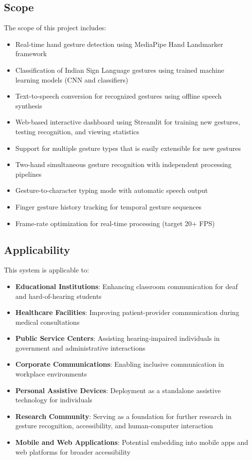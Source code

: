 \documentclass[12pt,a4paper]{report}
\begin{document}
\subsection{Scope}

The scope of this project includes:
\begin{itemize}
    \item Real-time hand gesture detection using MediaPipe Hand Landmarker framework
    \item Classification of Indian Sign Language gestures using trained machine learning models (CNN and classifiers)
    \item Text-to-speech conversion for recognized gestures using offline speech synthesis
    \item Web-based interactive dashboard using Streamlit for training new gestures, testing recognition, and viewing statistics
    \item Support for multiple gesture types that is easily extensible for new gestures
    \item Two-hand simultaneous gesture recognition with independent processing pipelines
    \item Gesture-to-character typing mode with automatic speech output
    \item Finger gesture history tracking for temporal gesture sequences
    \item Frame-rate optimization for real-time processing (target 20+ FPS)
\end{itemize}

\subsection{Applicability}

This system is applicable to:
\begin{itemize}
    \item \textbf{Educational Institutions}: Enhancing classroom communication for deaf and hard-of-hearing students
    \item \textbf{Healthcare Facilities}: Improving patient-provider communication during medical consultations
    \item \textbf{Public Service Centers}: Assisting hearing-impaired individuals in government and administrative interactions
    \item \textbf{Corporate Communications}: Enabling inclusive communication in workplace environments
    \item \textbf{Personal Assistive Devices}: Deployment as a standalone assistive technology for individuals
    \item \textbf{Research Community}: Serving as a foundation for further research in gesture recognition, accessibility, and human-computer interaction
    \item \textbf{Mobile and Web Applications}: Potential embedding into mobile apps and web platforms for broader accessibility
\end{itemize}
\end{document}
